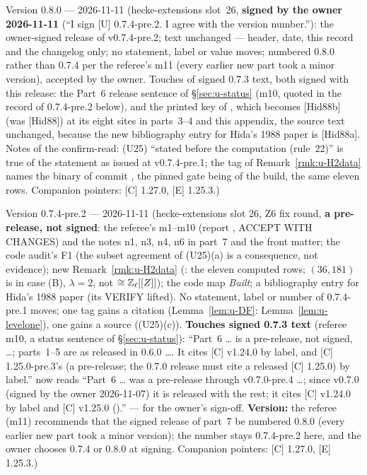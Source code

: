 \documentclass[11pt]{article}
\newcommand{\VERIFYloc}{\textsf{VERIFY}}          %
\newcommand{\Zl}{\Z_\ell}
\begin{document}
Version 0.8.0 --- 2026-11-11 (hecke-extensions slot~26, \textbf{signed by the owner 2026-11-11} (``I sign [U] 0.7.4-pre.2. I agree with the version number.''): the owner-signed release of v0.7.4-pre.2; text unchanged --- header, date, this record and the changelog only; no statement, label or value moves; numbered 0.8.0 rather than 0.7.4 per the referee's m11 (every earlier new part took a minor version), accepted by the owner. Touches of signed 0.7.3 text, both signed with this release: the Part~6 release sentence of \S\ref{sec:u-status} (m10, quoted in the record of 0.7.4-pre.2 below), and the printed key of \cite{hida_aif2}, which becomes [Hid88b] (was [Hid88]) at its eight sites in parts~3--4 and this appendix, the source text unchanged, because the new bibliography entry for Hida's 1988 paper is [Hid88a]. Notes of the confirm-read: (U25) ``stated before the computation (rule~22)'' is true of the statement as issued at v0.7.4-pre.1; the \COMP{} tag of Remark~\ref{rmk:u-H2data} names the binary of commit , the pinned gate being of the  build, the same eleven rows. Companion pointers: [C] 1.27.0, [E] 1.25.3.)

Version 0.7.4-pre.2 --- 2026-11-11 (hecke-extensions slot 26, Z6 fix round, \textbf{a pre-release, not signed}: the referee's m1--m10 (report , ACCEPT WITH CHANGES) and the notes n1, n3, n4, n6 in part~7 and the front matter; the code audit's F1 (the subset agreement of (U25)(a) is a consequence, not evidence); new Remark~\ref{rmk:u-H2data} (\COMP: the eleven computed rows; $(36,181)$ is in case (B), $\lambda=2$, not $\cong\Zl[[Z]]$); the code map \emph{Built}; a bibliography entry for Hida's 1988 paper (its \VERIFYloc{} lifted). No statement, label or number of 0.7.4-pre.1 moves; one tag gains a citation (Lemma~\ref{lem:u-DF}: Lemma~\ref{lem:u-levelone}), one gains a source ((U25)(c)). \textbf{Touches signed 0.7.3 text} (referee m10, a status sentence of \S\ref{sec:u-status}): ``Part~6 \dots{} is a pre-release, not signed, \dots; parts~1--5 are as released in 0.6.0 \dots. It cites [C] v1.24.0 by label, and [C] 1.25.0-pre.3's  (a pre-release; the 0.7.0 release must cite a released [C] 1.25.0) by label.'' now reads ``Part~6 \dots{} was a pre-release through v0.7.0-pre.4 \dots; since v0.7.0 (signed by the owner 2026-11-07) it is released with the rest; it cites [C] v1.24.0 by label and [C] v1.25.0 ().'' --- for the owner's sign-off. \textbf{Version:} the referee (m11) recommends that the signed release of part~7 be numbered 0.8.0 (every earlier new part took a minor version); the number stays 0.7.4-pre.2 here, and the owner chooses 0.7.4 or 0.8.0 at signing. Companion pointers: [C] 1.27.0, [E] 1.25.3.)
\end{document}
